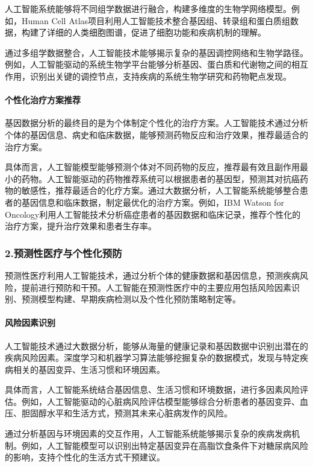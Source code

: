 人工智能系统能够将不同组学数据进行融合，构建多维度的生物学网络模型。例如，Human Cell Atlas项目利用人工智能技术整合基因组、转录组和蛋白质组数据，构建了详细的人类细胞图谱，促进了细胞功能和疾病机制的理解。

通过多组学数据整合，人工智能技术能够揭示复杂的基因调控网络和生物学路径。例如，人工智能驱动的系统生物学平台能够分析基因、蛋白质和代谢物之间的相互作用，识别出关键的调控节点，支持疾病的系统生物学研究和药物靶点发现。

\paragraph{个性化治疗方案推荐}

基因数据分析的最终目的是为个体制定个性化的治疗方案。人工智能技术通过分析个体的基因信息、病史和临床数据，能够预测药物反应和治疗效果，推荐最适合的治疗方案。

具体而言，人工智能模型能够预测个体对不同药物的反应，推荐最有效且副作用最小的药物。人工智能驱动的药物推荐系统可以根据患者的基因型，预测其对抗癌药物的敏感性，推荐最适合的化疗方案。通过大数据分析，人工智能系统能够整合患者的基因信息和临床数据，制定最优化的治疗方案。例如，IBM Watson for Oncology利用人工智能技术分析癌症患者的基因数据和临床记录，推荐个性化的治疗方案，提升治疗效果和患者生存率。

\subsubsection{2.预测性医疗与个性化预防}

预测性医疗利用人工智能技术，通过分析个体的健康数据和基因信息，预测疾病风险，提前进行预防和干预。人工智能在预测性医疗中的主要应用包括风险因素识别、预测模型构建、早期疾病检测以及个性化预防策略制定等。

\paragraph{风险因素识别}

人工智能技术通过大数据分析，能够从海量的健康记录和基因数据中识别出潜在的疾病风险因素。深度学习和机器学习算法能够挖掘复杂的数据模式，发现与特定疾病相关的基因变异、生活习惯和环境因素。

具体而言，人工智能系统结合基因信息、生活习惯和环境数据，进行多因素风险评估。例如，人工智能驱动的心脏病风险评估模型能够综合分析患者的基因变异、血压、胆固醇水平和生活方式，预测其未来心脏病发作的风险。

通过分析基因与环境因素的交互作用，人工智能系统能够揭示复杂的疾病发病机制。例如，人工智能模型可以识别出特定基因变异在高脂饮食条件下对糖尿病风险的影响，支持个性化的生活方式干预建议。

